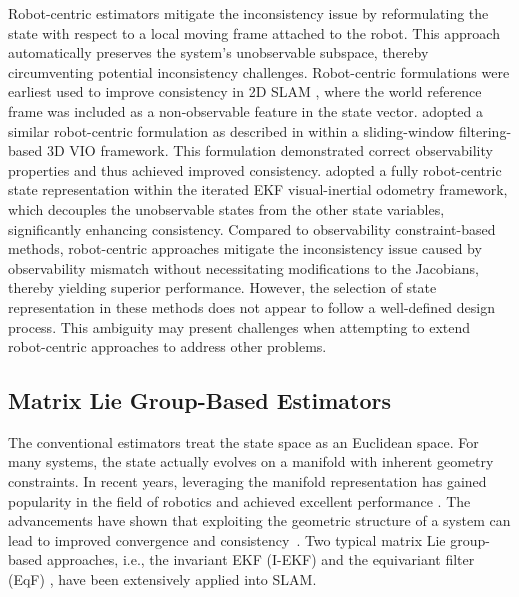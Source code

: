 Robot-centric estimators \cite{B53, B54, B55, B59, B29} mitigate the inconsistency issue by reformulating the state with respect to a local moving frame attached to the robot. This approach automatically preserves the system's unobservable subspace, thereby circumventing potential inconsistency challenges. Robot-centric formulations were earliest used to improve consistency in 2D SLAM \cite{B55, B59}, where the world reference frame was included as a non-observable feature in the state vector. \cite{B29, B30} adopted a similar robot-centric formulation as described in \cite{B55, B59} within a sliding-window filtering-based 3D VIO framework. This formulation demonstrated correct observability properties and thus achieved improved consistency. \cite{B53, B54} adopted a fully robot-centric state representation within the iterated EKF visual-inertial odometry framework, which decouples the unobservable states from the other state variables, significantly enhancing consistency. Compared to observability constraint-based methods, robot-centric approaches mitigate the inconsistency issue caused by observability mismatch without necessitating modifications to the Jacobians, thereby yielding superior performance. However, the selection of state representation in these methods does not appear to follow a well-defined design process. This ambiguity may present challenges when attempting to extend robot-centric approaches to address other problems.




\subsection{Matrix Lie Group-Based Estimators}
The conventional estimators treat the state space as an Euclidean space. For many systems, the state actually evolves on a manifold with inherent geometry constraints. In recent years, leveraging the manifold representation has gained popularity in the field of robotics and achieved excellent performance \cite{B47, B46}. The advancements have shown that exploiting the geometric structure of a system can lead to improved convergence and consistency~\cite{B48, B57}. Two typical matrix Lie group-based approaches, i.e., the invariant EKF (I-EKF) \cite{B44, B45, B33, B32} and the equivariant filter (EqF) \cite{B49, B51}, have been extensively applied into SLAM.

